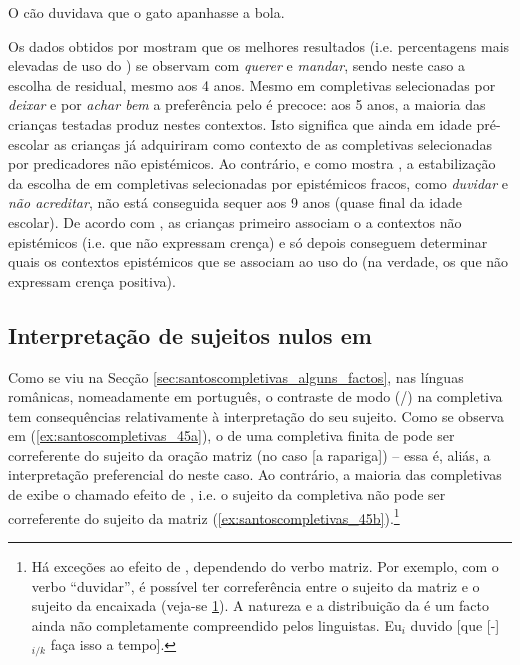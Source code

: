 \documentclass[output=paper]{LSP/langsci}
\begin{document}
\ea\label{ex:santoscompletivas_44} O cão duvidava que o gato apanhasse a bola.
\z

Os dados obtidos por \citet{jesus2014} mostram que os melhores resultados (i.e. percentagens mais elevadas de uso do ) se observam com \textit{querer} e \textit{mandar}, sendo neste caso a escolha de  residual, mesmo aos 4 anos. Mesmo em completivas selecionadas por \textit{deixar} e por \textit{achar bem} a preferência pelo  é precoce: aos 5 anos, a maioria das crianças testadas produz  nestes contextos. Isto significa que ainda em idade pré-escolar as crianças já adquiriram como contexto de  as completivas selecionadas por predicadores não epistémicos. Ao contrário, e como mostra \citet{jesus2014}, a estabilização da escolha de  em completivas selecionadas por epistémicos fracos, como \textit{duvidar} e \textit{não acreditar}, não está conseguida sequer aos 9 anos (quase final da idade escolar). De acordo com \citet{jesus2014}, as crianças primeiro associam o  a contextos não epistémicos (i.e. que não expressam crença) e só depois conseguem determinar quais os contextos epistémicos que se associam ao uso do  (na verdade, os que não expressam crença positiva).

\subsection{Interpretação de sujeitos nulos em }
\label{subsec:santoscompletivas_interpretacao_nulos}

Como se viu na Secção \ref{sec:santoscompletivas_alguns_factos}, nas línguas românicas, nomeadamente em português, o contraste de modo (/) na completiva tem consequências relativamente à interpretação do seu sujeito. Como se observa em (\ref{ex:santoscompletivas_45a}), o  de uma completiva finita de  pode ser correferente do sujeito da oração matriz (no caso [a rapariga]) – essa é, aliás, a interpretação preferencial do  neste caso. Ao contrário, a maioria das completivas de  exibe o chamado efeito de , i.e. o sujeito da completiva não pode ser correferente do sujeito da matriz (\ref{ex:santoscompletivas_45b}).\footnote{
Há exceções ao efeito de , dependendo do verbo matriz. Por exemplo, com o verbo ``duvidar'', é possível ter correferência entre o sujeito da matriz e o sujeito da encaixada (veja-se \ref{ex:santoscompletivas_i4}). A natureza e a distribuição da  é um facto ainda não completamente compreendido pelos linguistas.
\ea\label{ex:santoscompletivas_i4} Eu$_i$ duvido [que [-]$_{i/k}$ faça isso a tempo].
\z
}
\end{document}
